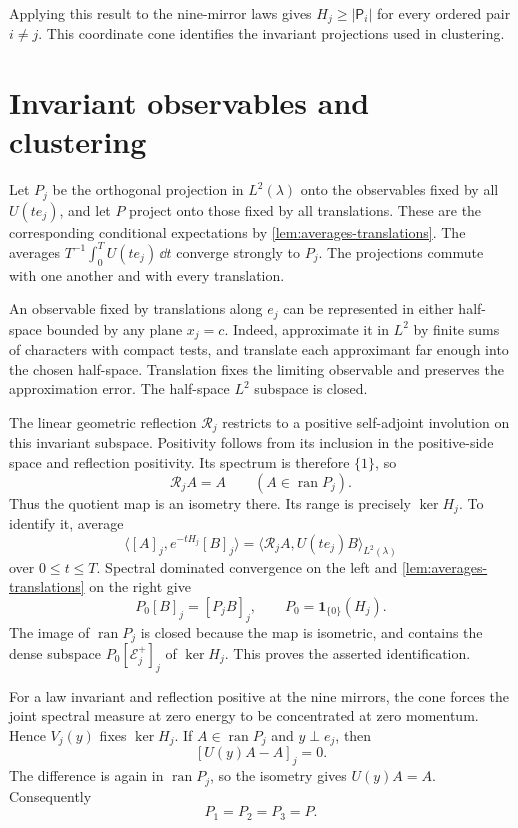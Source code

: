 Applying this result to the nine-mirror laws gives
$H_j\ge|\mathsf P_i|$ for every ordered pair $i\ne j$. This coordinate
cone identifies the invariant projections used in clustering.

\section{Invariant observables and clustering}
\label{subsec:invariant-reflection}

Let $P_j$ be the orthogonal projection in $L^2(\lambda)$ onto the
observables fixed by all $U(te_j)$, and let $P$ project onto those
fixed by all translations. These are the corresponding conditional
expectations by \cref{lem:averages-translations}. The averages
$T^{-1}\int_0^TU(te_j)\,\dd t$ converge strongly to $P_j$.
The projections commute with one another and with every translation.

An observable fixed by translations along $e_j$ can be represented
in either half-space bounded by any plane $x_j=c$. Indeed, approximate
it in $L^2$ by finite sums of characters with compact tests, and translate
each approximant far enough into the chosen half-space. Translation
fixes the limiting observable and preserves the approximation error.
The half-space $L^2$ subspace is closed.

The linear geometric reflection $\mathcal R_j$ restricts to a positive
self-adjoint involution on this invariant subspace. Positivity follows
from its inclusion in the positive-side space and reflection
positivity. Its spectrum is therefore $\{1\}$, so
\begin{equation}\label{eq:invariant-reflection-fixed}
 \mathcal R_jA=A\qquad(A\in\operatorname{ran}P_j).
\end{equation}
Thus the quotient map is an isometry there. Its range is precisely
$\ker H_j$. To identify it, average
\[
 \langle[A]_j,e^{-tH_j}[B]_j\rangle
     =\langle\mathcal R_jA,U(te_j)B\rangle_{L^2(\lambda)}
\]
over $0\le t\le T$. Spectral dominated convergence on the left and
\cref{lem:averages-translations} on the right give
\begin{equation}\label{eq:zero-energy-class}
 P_0[B]_j=[P_jB]_j,\qquad P_0=\mathbf1_{\{0\}}(H_j).
\end{equation}
The image of $\operatorname{ran}P_j$ is closed because the map is
isometric, and contains the dense subspace $P_0[\mathcal E_j^+]_j$
of $\ker H_j$. This proves the asserted identification.

For a law invariant and reflection positive at the nine mirrors,
the cone forces the joint spectral measure at zero energy to be
concentrated at zero momentum. Hence $V_j(y)$ fixes $\ker H_j$.
If $A\in\operatorname{ran}P_j$ and $y\perp e_j$, then
\[
 [U(y)A-A]_j=0.
\]
The difference is again in $\operatorname{ran}P_j$, so the isometry
gives $U(y)A=A$. Consequently
\begin{equation}\label{eq:invariant-projections-equal}
 P_1=P_2=P_3=P.
\end{equation}

